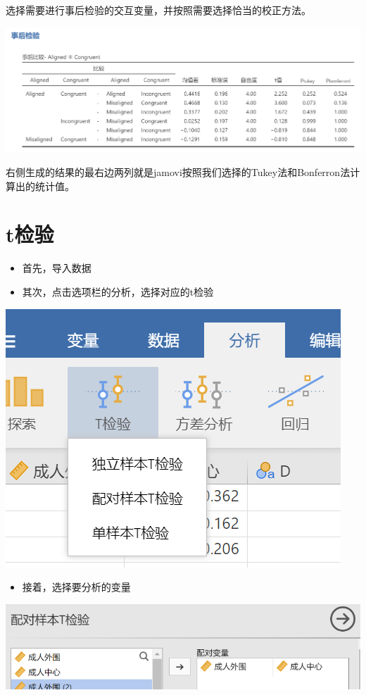 \documentclass[]{ctexbook}
\providecommand{\tightlist}{%
  \setlength{\itemsep}{0pt}\setlength{\parskip}{0pt}}
\theoremstyle{definition}
\theoremstyle{definition}
\theoremstyle{definition}
\theoremstyle{definition}
\theoremstyle{remark}
\begin{document}
选择需要进行事后检验的交互变量，并按照需要选择恰当的校正方法。

\includegraphics{img/jamovi/rmanova-posthoc-results.png}

右侧生成的结果的最右边两列就是jamovi按照我们选择的Tukey法和Bonferron法计算出的统计值。

\section{t检验}\label{tux68c0ux9a8c}

\begin{itemize}
\tightlist
\item
  首先，导入数据
\item
  其次，点击选项栏的分析，选择对应的t检验
\end{itemize}

\includegraphics{img/jamovi/ttest.png}

\begin{itemize}
\tightlist
\item
  接着，选择要分析的变量
\end{itemize}

\includegraphics{img/jamovi/ttest-compare.png}
\end{document}
